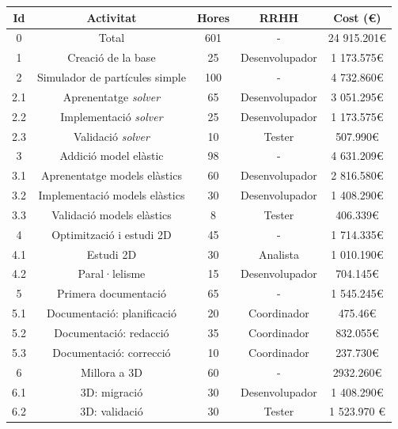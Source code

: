 \documentclass[a4paper]{report}
\begin{document}
	\begin{table}
		\centering
		\begin{tabular}{|| c | c || c | c | c ||}
			\hline
			\textbf{Id} & \textbf{Activitat} & \textbf{Hores} & \textbf{RRHH} & \textbf{Cost (\euro)} \\
			\hline
			0 & Total & 601 & - & 24 915.201\euro \\ %
			\hline \hline
			1 & Creació de la base & 25 & Desenvolupador & 1 173.575\euro \\
			\hline \hline
			2 & Simulador de partícules simple & 100 & - & 4 732.860\euro\\
			\hline
			2.1 & Aprenentatge \textit{solver} & 65 & Desenvolupador &  3 051.295\euro \\
			2.2 & Implementació \textit{solver} & 25 & Desenvolupador & 1 173.575\euro \\
			2.3 & Validació \textit{solver} & 10 & Tester & 507.990\euro \\
			\hline \hline
			3 & Addició model elàstic & 98 & - & 4 631.209\euro \\
			\hline
			3.1 & Aprenentatge models elàstics & 60 & Desenvolupador & 2 816.580\euro \\
			3.2 & Implementació models elàstics & 30 & Desenvolupador & 1 408.290\euro \\
			3.3 & Validació models elàstics & 8 & Tester & 406.339\euro \\
			\hline \hline
			4 & Optimització i estudi 2D & 45 & - & 1 714.335\euro \\
			\hline
			4.1 & Estudi 2D & 30 & Analista & 1 010.190\euro \\ 
			4.2 & Paral·lelisme & 15 & Desenvolupador & 704.145\euro \\
			\hline \hline
			5 & Primera documentació & 65 & - & 1 545.245\euro \\ 
			\hline
			5.1 & Documentació: planificació & 20 & Coordinador & 475.46\euro \\ 
			5.2 & Documentació: redacció & 35 & Coordinador & 832.055\euro \\
			5.3 & Documentació: correcció & 10 & Coordinador & 237.730\euro \\
			\hline \hline
			6 & Millora a 3D & 60 & -& 2932.260\euro \\
			\hline
			6.1 & 3D: migració & 30 & Desenvolupador & 1 408.290\euro \\
			6.2 & 3D: validació & 30 & Tester & 1 523.970 \euro \\
			\hline \hline

\end{tabular}
\end{table}
\end{document}
